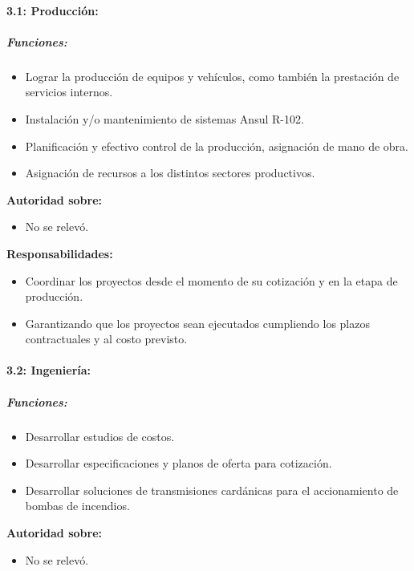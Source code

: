 \documentclass[a4paper,10pt]{article}
\begin{document}
		\paragraph{3.1: Producción:}

			\subparagraph{Funciones:}
			\begin{itemize}
 			\item Lograr la producción de equipos y vehículos, como también la prestación de servicios internos.
 			\item Instalación y/o mantenimiento de sistemas Ansul R-102.
 			\item Planificación y efectivo control de la producción, asignación de mano de obra.
	 		\item Asignación de recursos a los distintos sectores productivos.
	 		\end{itemize}
			

		\textbf{Autoridad sobre:} 
		\begin{itemize}
		\item No se relevó.
		\end{itemize}

			\textbf{Responsabilidades:}
			\begin{itemize}
				\item Coordinar los proyectos desde el momento de su cotización y en la etapa de producción.
				\item Garantizando que los proyectos sean ejecutados cumpliendo los plazos contractuales y al costo
previsto.
			\end{itemize}

			\paragraph{3.2: Ingeniería:}
			\subparagraph{Funciones:}
			\begin{itemize}
	 			\item Desarrollar estudios de costos.
	 			\item Desarrollar especificaciones y planos de oferta para cotización. 
	 			\item Desarrollar soluciones de transmisiones cardánicas para el accionamiento de bombas de incendios.
	 		\end{itemize}
			

		\textbf{Autoridad sobre:} 
		\begin{itemize}
			\item No se relevó.
		\end{itemize}
\end{document}
